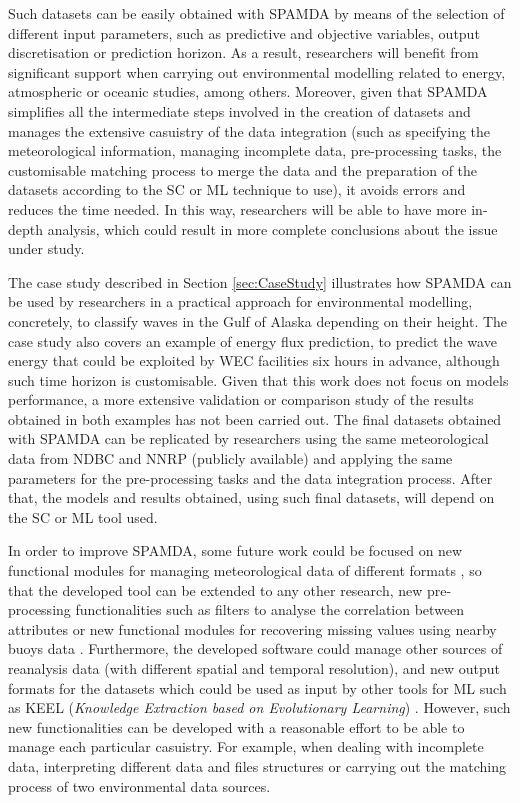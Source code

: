 \documentclass[energies,article,accept,moreauthors,pdftex]{Definitions/mdpi}
\begin{document}
\begin{paracol}{2}
		Such datasets can be easily obtained with SPAMDA by means of the selection of different input parameters, such as predictive and objective variables, output discretisation or prediction horizon. As a result, researchers will benefit from significant support when carrying out environmental modelling related to energy, atmospheric or oceanic studies, among others. Moreover, given that SPAMDA simplifies all the intermediate steps involved in the creation of datasets and manages the extensive casuistry of the data integration (such as specifying the meteorological information, managing incomplete data, pre-processing tasks, the customisable matching process to merge the data and the preparation of the datasets according to the SC or ML technique to use), it avoids errors and reduces the time needed. In this way, researchers will be able to have more in-depth analysis, which could result in more complete conclusions about the issue under study.
		
		The case study described in Section \ref{sec:CaseStudy} illustrates how SPAMDA can be used by researchers in a practical approach for environmental modelling, concretely, to classify waves in the Gulf of Alaska depending on their height. The case study also covers an example of energy flux prediction, to predict the wave energy that could be exploited by WEC facilities six hours in advance, although such time horizon is customisable. Given that this work does not focus on models performance, a more extensive validation or comparison study of the results obtained in both examples has not been carried out. {The final datasets obtained with SPAMDA can be replicated by researchers using the same meteorological data from NDBC and NNRP (publicly available) and applying the same parameters for the pre-processing tasks and the data integration process. After that, the models and results obtained, using such final datasets, will depend on the SC or ML tool used.}

		In order to improve SPAMDA, some future work could be focused on new functional modules for managing meteorological data of different formats \cite{NOAA_3}, so that the developed tool can be extended to any other research, new pre-processing functionalities such as filters to analyse the correlation between attributes or new functional modules for recovering missing values using nearby buoys data \cite{DuranRosal2016}. Furthermore, the developed software could manage other sources of reanalysis data (with different spatial and temporal resolution), and new output formats for the datasets which could be used as input by other tools for ML such as KEEL (\textit{Knowledge Extraction based on Evolutionary Learning}) \cite{AlcalFdez2009KEELAS}. However, such new functionalities can be developed with a reasonable effort to be able to manage each particular casuistry. For example, when dealing with incomplete data, interpreting different data and files structures or carrying out the matching process of two environmental data sources.


\end{paracol}
\end{document}
